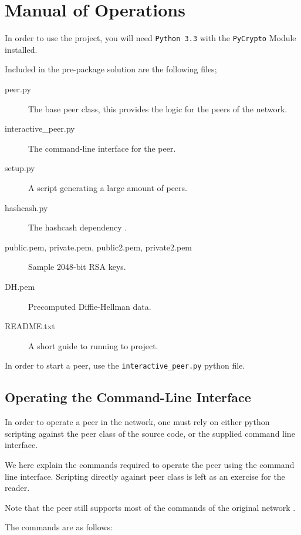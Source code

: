 \section{Manual of Operations}

In order to use the project, you will need \texttt{Python 3.3} with the \texttt{PyCrypto} Module installed.

Included in the pre-package solution are the following files;
\begin{description}
\item[peer.py] The base peer class, this provides the logic for the peers of the network.
\item[interactive\_peer.py] The command-line interface for the peer.
\item[setup.py] A script generating a large amount of peers.
\item[hashcash.py] The hashcash dependency \citep{HashCash}.
\item[public.pem, private.pem, public2.pem, private2.pem] Sample 2048-bit RSA keys.
\item[DH.pem] Precomputed Diffie-Hellman data.
\item[README.txt] A short guide to running to project. 
\end{description}

In order to start a peer, use the \texttt{interactive\_peer.py} python file.



\subsection{Operating the Command-Line Interface}
In order to operate a peer in the network, one must rely on either python scripting against the peer class of the source code, or the supplied command line interface.

We here explain the commands required to operate the peer using the command line interface. Scripting directly against peer class is left as an exercise for the reader.

Note that the peer still supports most of the commands of the original network \citep{P2PN}.

The commands are as follows:

